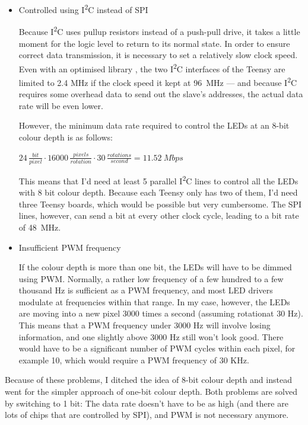 \documentclass[a4paper, 11pt, titlepage]{report}
\def \itwoc {I\textsuperscript{2}C\xspace}
\newenvironment{ownmath}
{\vspace{2mm}\hspace{15pt}\begin{math}}
{\end{math}\vspace{2mm}}
\begin{document}
\begin{itemize}

\item Controlled using \itwoc  instead of SPI

Because \itwoc uses pullup resistors instead of a push-pull drive, it takes a little moment for
the logic level to return to its normal state. In order to ensure correct data transmission, it is
necessary to set a relatively slow clock speed. Even with an optimised library \cite{iiclib}, the
two \itwoc interfaces of the Teensy are limited to 2.4 MHz if the clock speed it kept at
\SI{96}{\mega\hertz} --- and because \itwoc requires some overhead data to send out the slave's
addresses, the actual data rate will be even lower.

However, the minimum data rate required to control the LEDs at an 8-bit colour depth is as
follows:

\begin{ownmath}
24\,\frac{\si{bit}}{\si{pixel}} \cdot 16000\,\frac{\si{pixels}}{\si{rotation}} \cdot
30\,\frac{\si{rotations}}{\si{second}} = \SI{11.52}{Mbps}
\end{ownmath}

This means that I'd need at least 5 parallel \itwoc lines to control all the LEDs with 8 bit
colour depth. Because each Teensy only has two of them, I'd need three Teensy boards, which would
be possible but very cumbersome. The SPI lines, however, can send a bit at every other clock
cycle, leading to a bit rate of \SI{48}{\mega\hertz}.

\item Insufficient PWM frequency

If the colour depth is more than one bit, the LEDs will have to be dimmed using PWM. Normally, a
rather low frequency of a few hundred to a few thousand Hz is sufficient as a PWM frequency, and
most LED drivers modulate at frequencies within that range. In my case, however, the LEDs are
moving into a new pixel 3000 times a second (assuming rotationat 30 Hz). This means that a PWM
frequency under 3000 Hz will involve losing information, and one slightly above 3000 Hz still
won't look good. There would have to be a significant number of PWM cycles within each pixel,
for example 10, which would require a PWM frequency of 30 KHz.

\end{itemize}

Because of these problems, I ditched the idea of 8-bit colour depth and instead went for the
simpler approach of one-bit colour depth. Both problems are solved by switching to 1 bit: The data
rate doesn't have to be as high (and there are lots of chips that are controlled by SPI), and PWM
is not necessary anymore.
\end{document}
